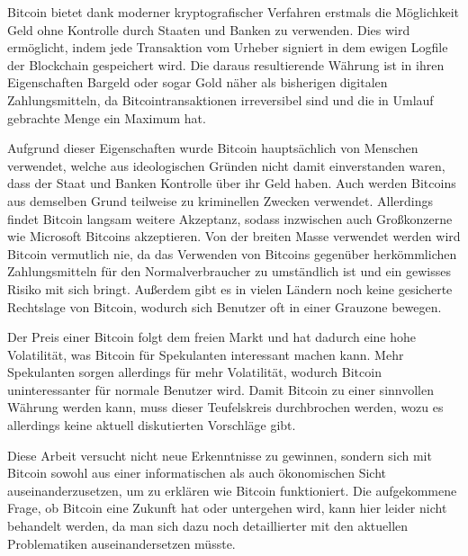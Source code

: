 Bitcoin bietet dank moderner kryptografischer Verfahren erstmals die Möglichkeit Geld ohne Kontrolle durch Staaten und Banken zu verwenden.
Dies wird ermöglicht, indem jede Transaktion vom Urheber signiert in dem ewigen Logfile der Blockchain gespeichert wird.
Die daraus resultierende Währung ist in ihren Eigenschaften Bargeld oder sogar Gold näher als bisherigen digitalen Zahlungsmitteln, da Bitcointransaktionen irreversibel sind und die in Umlauf gebrachte Menge ein Maximum hat.

Aufgrund dieser Eigenschaften wurde Bitcoin hauptsächlich von Menschen verwendet, welche aus ideologischen Gründen nicht damit einverstanden waren, dass der Staat und Banken Kontrolle über ihr Geld haben.
Auch werden Bitcoins aus demselben Grund teilweise zu kriminellen Zwecken verwendet.
Allerdings findet Bitcoin langsam weitere Akzeptanz, sodass inzwischen auch Großkonzerne wie Microsoft Bitcoins akzeptieren.
Von der breiten Masse verwendet werden wird Bitcoin vermutlich nie, da das Verwenden von Bitcoins gegenüber herkömmlichen Zahlungsmitteln für den Normalverbraucher zu umständlich ist und ein gewisses Risiko mit sich bringt.
Außerdem gibt es in vielen Ländern noch keine gesicherte Rechtslage von Bitcoin, wodurch sich Benutzer oft in einer Grauzone bewegen.

Der Preis einer Bitcoin folgt dem freien Markt und hat dadurch eine hohe Volatilität, was Bitcoin für Spekulanten interessant machen kann.
Mehr Spekulanten sorgen allerdings für mehr Volatilität, wodurch Bitcoin uninteressanter für normale Benutzer wird.
Damit Bitcoin zu einer sinnvollen Währung werden kann, muss dieser Teufelskreis durchbrochen werden, wozu es allerdings keine aktuell diskutierten Vorschläge gibt.

Diese Arbeit versucht nicht neue Erkenntnisse zu gewinnen, sondern sich mit Bitcoin sowohl aus einer informatischen als auch ökonomischen Sicht auseinanderzusetzen, um zu erklären wie Bitcoin funktioniert.
Die aufgekommene Frage, ob Bitcoin eine Zukunft hat oder untergehen wird, kann hier leider nicht behandelt werden, da man sich dazu noch detaillierter mit den aktuellen Problematiken auseinandersetzen müsste.
